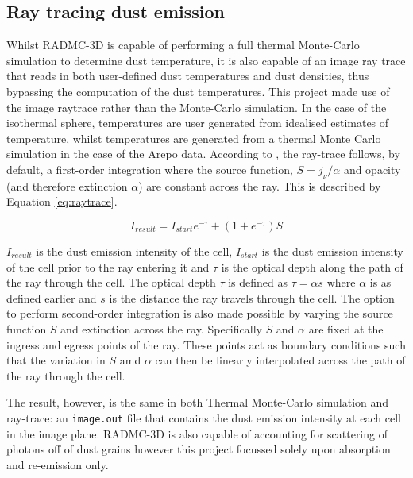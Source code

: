 \documentclass{report}
\begin{document}
\subsection{Ray tracing dust emission} \label{sec:rt_des}
Whilst RADMC-3D is capable of performing a full thermal Monte-Carlo simulation to determine dust temperature, it is also capable of an image ray trace that reads in both user-defined dust temperatures and dust densities, thus bypassing the computation of the dust temperatures. This project made use of the image raytrace rather than the Monte-Carlo simulation. In the case of the isothermal sphere, temperatures are user generated from idealised estimates of temperature, whilst temperatures are generated from a thermal Monte Carlo simulation in the case of the Arepo data. According to \textcite{manual}, the ray-trace follows, by default, a first-order integration where the source function, $S = j_{\nu}/\alpha$ and opacity (and therefore extinction $\alpha$) are constant across the ray. This is described by Equation \ref{eq:raytrace}.

\begin{equation}
  I_{result} = I_{start}e^{-\tau}+(1+e^{-\tau})S
  \label{eq:raytrace}
\end{equation}

$I_{result}$ is the dust emission intensity of the cell, $I_{start}$ is the dust emission intensity of the cell prior to the ray entering it and $\tau$ is the optical depth along the path of the ray through the cell. The optical depth $\tau$ is defined as $\tau = \alpha s$ where $\alpha$ is as defined earlier and $s$ is the distance the ray travels through the cell. The option to perform second-order integration is also made possible by varying the source function $S$ and extinction across the ray. Specifically $S$ and $\alpha$ are fixed at the ingress and egress points of the ray. These points act as boundary conditions such that the variation in $S$ amd $\alpha$ can then be linearly interpolated across the path of the ray through the cell.

The result, however, is the same in both Thermal Monte-Carlo simulation and ray-trace: an \texttt{image.out} file that contains the dust emission intensity at each cell in the image plane. RADMC-3D is also capable of accounting for scattering of photons off of dust grains however this project focussed solely upon absorption and re-emission only.

\end{document}
